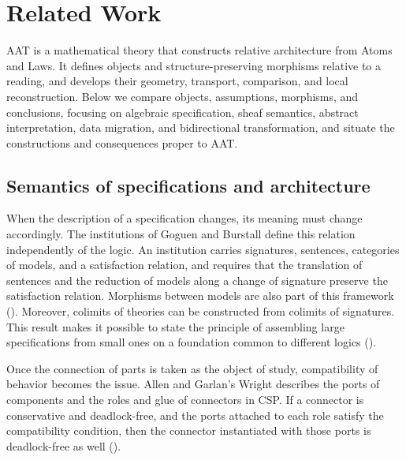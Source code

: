 \chapter*{Related Work}

AAT is a mathematical theory that constructs relative architecture from Atoms and Laws.
It defines objects and structure-preserving morphisms relative to a reading, and develops
their geometry, transport, comparison, and local reconstruction. Below we compare objects,
assumptions, morphisms, and conclusions, focusing on algebraic specification, sheaf
semantics, abstract interpretation, data migration, and bidirectional transformation, and
situate the constructions and consequences proper to AAT.

\section{Semantics of specifications and architecture}\label{sec:R.1}

When the description of a specification changes, its meaning must change accordingly.
The institutions of Goguen and Burstall define this relation independently of the logic.
An institution carries signatures, sentences, categories of models, and a satisfaction
relation, and requires that the translation of sentences and the reduction of models along
a change of signature preserve the satisfaction relation. Morphisms between models are also
part of this framework
(\cite[\href{https://courses.grainger.illinois.edu/cs522/sp2016/InstitutionsAbstractModelTheory.pdf}{\S2.1, Definition 1}]{GB92}).
Moreover, colimits of theories can be constructed from colimits of signatures.
This result makes it possible to state the principle of assembling large specifications from
small ones on a foundation common to different logics
(\cite[\href{https://courses.grainger.illinois.edu/cs522/sp2016/InstitutionsAbstractModelTheory.pdf}{Theorem 11 and its consequences, p. 108}]{GB92}).

Once the connection of parts is taken as the object of study, compatibility of behavior
becomes the issue. Allen and Garlan's Wright describes the ports of components and the roles
and glue of connectors in CSP. If a connector is conservative and deadlock-free, and
the ports attached to each role satisfy the compatibility condition, then the connector
instantiated with those ports is deadlock-free as well
(\cite[\href{https://ix.cs.uoregon.edu/~michal/Classes/f01/fsv/papers/Allen-Garlan.pdf}{\S\S8.1--8.2, Definition 8.1.2, Theorem 8.2.3}]{AG97}).

